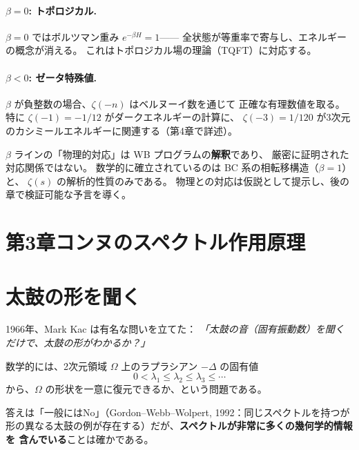 \paragraph{$\beta = 0$: トポロジカル.}
$\beta = 0$ ではボルツマン重み $e^{-\beta H} = 1$——
全状態が等重率で寄与し、エネルギーの概念が消える。
これはトポロジカル場の理論（TQFT）に対応する。

\paragraph{$\beta < 0$: ゼータ特殊値.}
$\beta$ が負整数の場合、$\zeta(-n)$ はベルヌーイ数を通じて
正確な有理数値を取る。特に $\zeta(-1) = -1/12$ がダークエネルギーの計算に、
$\zeta(-3) = 1/120$ が3次元のカシミールエネルギーに関連する（第4章で詳述）。

\begin{hypbox}[注意: 仮説の範囲]
$\beta$ ラインの「物理的対応」は WB プログラムの\textbf{解釈}であり、
厳密に証明された対応関係ではない。
数学的に確立されているのは BC 系の相転移構造（$\beta = 1$）と、
$\zeta(s)$ の解析的性質のみである。
物理との対応は仮説として提示し、後の章で検証可能な予言を導く。
\end{hypbox}


\section*{第3章\quad コンヌのスペクトル作用原理}

\section{太鼓の形を聞く}
\label{sec:3.1}

1966年、Mark Kac は有名な問いを立てた：
\textit{「太鼓の音（固有振動数）を聞くだけで、太鼓の形がわかるか？」}

数学的には、2次元領域 $\Omega$ 上のラプラシアン $-\Delta$ の固有値
\[
  0 < \lambda_1 \leq \lambda_2 \leq \lambda_3 \leq \cdots
\]
から、$\Omega$ の形状を一意に復元できるか、という問題である。

答えは「一般にはNo」（Gordon--Webb--Wolpert, 1992：同じスペクトルを持つが
形の異なる太鼓の例が存在する）だが、\textbf{スペクトルが非常に多くの幾何学的情報を
含んでいる}ことは確かである。

